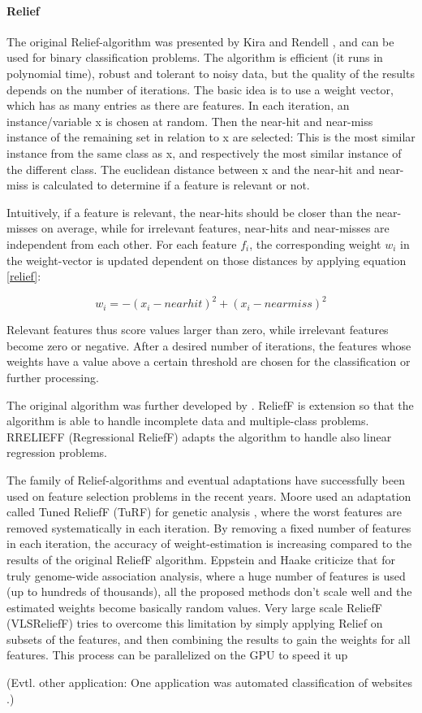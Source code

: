 \paragraph{Relief}
\label{par:methods.flat.filter.relief}

The original Relief-algorithm was presented by Kira and Rendell \cite{Kira:92}, and can be used for binary classification problems. The algorithm is efficient (it runs in polynomial time), robust and tolerant to noisy data, but the quality of the results depends on the number of iterations.
The basic idea is to use a weight vector, which has as many entries as there are features. In each iteration, an instance/variable x is chosen at random. Then the near-hit and near-miss instance of the remaining set in relation to x are selected: This is the most similar instance from the same class as x, and respectively the most similar instance of the different class. The euclidean distance between x and the near-hit and near-miss is calculated to determine if a feature is relevant or not.  

Intuitively, if a feature is relevant, the near-hits should be closer than the near-misses on average, while for irrelevant features, near-hits and near-misses are independent from each other. 
For each feature $f_i$, the corresponding weight $w_i$ in the weight-vector is updated dependent on those distances by applying equation \ref{relief}:

\begin{equation}
\label{relief}
w_i = - (x_i - nearhit)^2  + (x_i - nearmiss)^2
\end{equation}

Relevant features thus score values larger than zero, while irrelevant features become zero or negative. After a desired number of iterations, the features whose weights have a value above a certain threshold are chosen for the classification or further processing.

The original algorithm was further developed by \cite{Kononenko:97}. ReliefF  is extension so that the algorithm is able to handle incomplete data and multiple-class problems. 
RRELIEFF (Regressional ReliefF) \cite{Robnik-Sikonja:97} adapts the algorithm to handle also linear regression problems.

The family of Relief-algorithms and eventual adaptations have successfully been used on feature selection problems in the recent years. Moore used an adaptation called Tuned ReliefF (TuRF) for genetic analysis \cite{Moore:07}, where the worst features are removed systematically in each iteration. By removing a fixed number of features in each iteration, the accuracy of weight-estimation is increasing compared to the results of the original ReliefF algorithm. Eppstein and Haake \cite{Eppstein:08} criticize that for truly genome-wide association analysis, where a huge number of features is used (up to hundreds of thousands), all the proposed methods don't scale well and the estimated weights become basically random values. Very large scale ReliefF (VLSReliefF) tries to overcome this limitation by simply applying Relief on subsets of the features, and then combining the results to gain the weights for all features. This process can be parallelized on the GPU to speed it up \cite{Lee:15}

(Evtl. other application: One application was automated classification of websites \cite{Jin:07}.)

